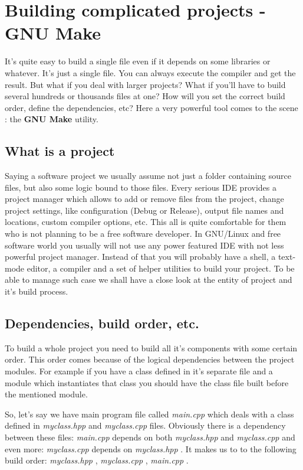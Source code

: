 
\section{Building complicated projects - GNU Make}
\label{make}
It's quite easy to build a single file even if it depends on some libraries or whatever. It's just a single file. You can always execute the compiler and get the result. But what if you deal with larger projects? What if you'll have to build several hundreds or thousands files at one? How will you set the correct build order, define the dependencies, etc? Here a very powerful tool comes to the scene : the \textbf {GNU Make} utility.

\subsection{What is a project}
Saying a software project we usually assume not just a folder containing source files, but also some logic bound to those files. Every serious IDE provides a project manager which allows to add or remove files from the project, change project settings, like configuration (Debug or Release), output file names and locations, custom compiler options, etc. This all is quite comfortable for them who is not planning to be a free software developer. In GNU/Linux and free software world you usually will not use any power featured IDE with not less powerful project manager. Instead of that you will probably have a shell, a text-mode editor, a compiler and a set of helper utilities to build your project. To be able to manage such case we shall have a close look at the entity of project and it's build process.

\subsection{Dependencies, build order, etc.}
\label{deps_order_etc}
To build a whole project you need to build all it's components with some certain order. This order comes because of the logical dependencies between the project modules. For example if you have a class defined in it's separate file and a module which instantiates that class you should have the class file built before the mentioned module.

So, let's say we have main program file called \textit { main.cpp} which deals with a class defined in \textit { myclass.hpp } and \textit { myclass.cpp } files. Obviously there is a dependency between these files: \textit { main.cpp } depends on both \textit { myclass.hpp } and \textit { myclass.cpp } and even more: \textit { myclass.cpp } depends on \textit { myclass.hpp }. It makes us to to the following build order: \textit { myclass.hpp }, \textit { myclass.cpp }, \textit { main.cpp }.

